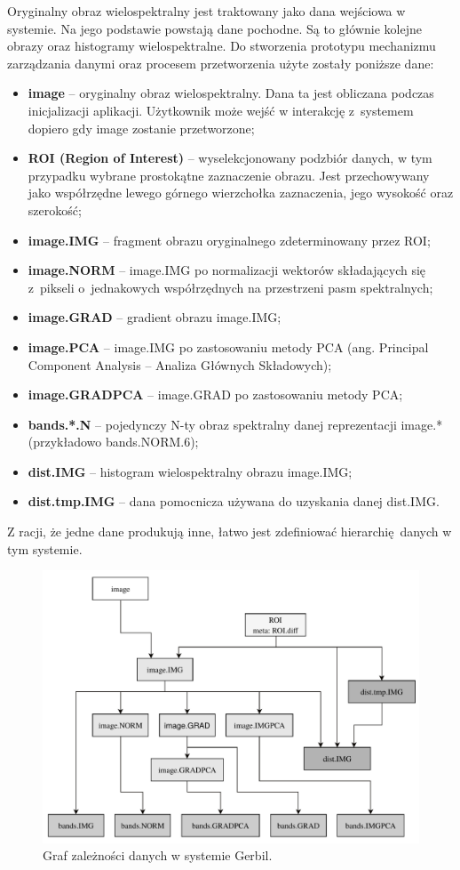 Oryginalny obraz wielospektralny jest traktowany jako dana wejściowa w systemie. Na jego podstawie powstają dane pochodne. Są to głównie kolejne obrazy oraz histogramy wielospektralne. Do stworzenia prototypu mechanizmu zarządzania danymi oraz procesem przetworzenia użyte zostały poniższe dane:
\begin{itemize}
	\item {} \textbf{image} -- oryginalny obraz wielospektralny. Dana ta jest obliczana podczas inicjalizacji aplikacji. Użytkownik może wejść w interakcję z~systemem dopiero gdy image zostanie przetworzone;
	\item {} \textbf{ROI (Region of Interest)} -- wyselekcjonowany podzbiór danych, w tym przypadku wybrane prostokątne zaznaczenie obrazu. Jest przechowywany jako współrzędne lewego górnego wierzchołka zaznaczenia, jego wysokość oraz szerokość;
	\item {} \textbf{image.IMG} -- fragment obrazu oryginalnego zdeterminowany przez ROI;
	\item {} \textbf{image.NORM} -- image.IMG po normalizacji wektorów składających się z~pikseli o~jednakowych współrzędnych na przestrzeni pasm spektralnych;
	\item {} \textbf{image.GRAD} -- gradient obrazu image.IMG;
	\item {} \textbf{image.PCA} -- image.IMG po zastosowaniu metody PCA (ang. Principal Component Analysis -- Analiza Głównych Składowych)\cite{PCA};
	\item {} \textbf{image.GRADPCA} -- image.GRAD po zastosowaniu metody PCA;
	\item {} \textbf{bands.*.N} -- pojedynczy N-ty obraz spektralny danej reprezentacji image.* (przykładowo bands.NORM.6);
	\item {} \textbf{dist.IMG} -- histogram wielospektralny obrazu image.IMG;
	\item {} \textbf{dist.tmp.IMG} -- dana pomocnicza używana do uzyskania danej dist.IMG. 
\end{itemize}
Z racji, że jedne dane produkują inne, łatwo jest zdefiniować hierarchię danych w tym systemie.

\begin{figure}[ht]
	\centering
		\includegraphics[width=0.7\linewidth]{rys02/data-dependencies}
	\caption{Graf zależności danych w systemie Gerbil.}
	\label{fig:data-dependencies}	
\end{figure}

